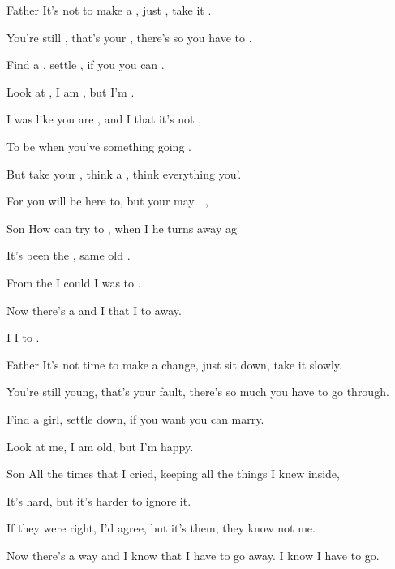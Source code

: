 

Father
\zs
It's not  to make a , just , take it .

You're still , that's your , there's so  you have to .

Find a , settle , if you  you can .

Look at , I am , but I'm . ~ 
\ks

\zs
I was  like you are , and I  that it's not ,

To be  when you've  something going .  ~ 

But take your , think a , think  everything you'.

For you will  be here to, but your  may . , 
\ks

Son
\zs
How can  try to , when I  he turns away ag

It's  been the , same old .  ~ 

From the  I could  I was  to .

Now there's a  and I  that I  to  away.

I  I  to .  \\
\ks

Father
\zs
It's not time to make a change, just sit down, take it slowly.

You're still young, that's your fault, there's so much you have to go through.

Find a girl, settle down, if you want you can marry. 

Look at me, I am old, but I'm happy.
\ks

Son
\zs
All the times that I cried, keeping all the things I knew inside, 

It's hard, but it's harder to ignore it.

If they were right, I'd agree, but it's them, they know not me.

Now there's a way and I know that I have to go away. I know I have to go.
\ks

\kp
